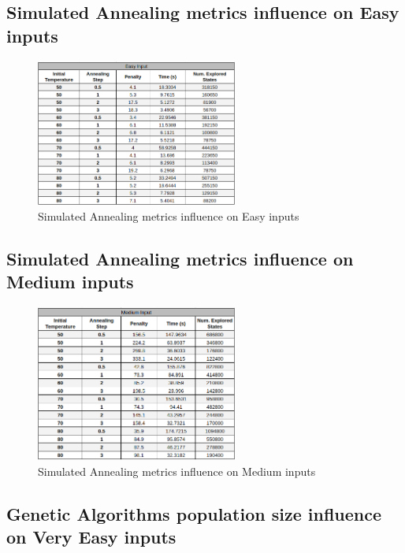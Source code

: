 \documentclass[conference]{IEEEtran}
\begin{document}
\subsection{Simulated Annealing metrics influence on Easy inputs}

\begin{figure}[H]
    \centerline{\includegraphics[width=250px]{annealing_easy.png}}
    \caption{Simulated Annealing metrics influence on Easy inputs}
\end{figure}

\subsection{Simulated Annealing metrics influence on Medium inputs}

\begin{figure}[H]
    \centerline{\includegraphics[width=250px]{annealing_medium.png}}
    \caption{Simulated Annealing metrics influence on Medium inputs}
\end{figure}

\subsection{Genetic Algorithms population size influence on Very Easy inputs}
\end{document}
